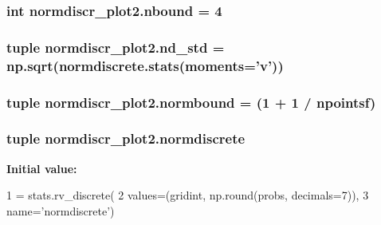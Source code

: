 \subsubsection[{nbound}]{\setlength{\rightskip}{0pt plus 5cm}int normdiscr\+\_\+plot2.\+nbound = 4}\label{namespacenormdiscr__plot2_a75e9153d69cb7c81a7ce8a505f2aa7ae}
\hypertarget{namespacenormdiscr__plot2_aa6b0f5d41e331e7549b122192c1db0a0}{}
\subsubsection[{nd\+\_\+std}]{\setlength{\rightskip}{0pt plus 5cm}tuple normdiscr\+\_\+plot2.\+nd\+\_\+std = {\bf np.\+sqrt}(normdiscrete.\+stats(moments='v'))}\label{namespacenormdiscr__plot2_aa6b0f5d41e331e7549b122192c1db0a0}
\hypertarget{namespacenormdiscr__plot2_a1d8a343b3fc043bbc9cd58f5e5649453}{}
\subsubsection[{normbound}]{\setlength{\rightskip}{0pt plus 5cm}tuple normdiscr\+\_\+plot2.\+normbound = (1 + 1 / {\bf npointsf})}\label{namespacenormdiscr__plot2_a1d8a343b3fc043bbc9cd58f5e5649453}
\hypertarget{namespacenormdiscr__plot2_a2441ca073bb0331350476716954626c7}{}
\subsubsection[{normdiscrete}]{\setlength{\rightskip}{0pt plus 5cm}tuple normdiscr\+\_\+plot2.\+normdiscrete}\label{namespacenormdiscr__plot2_a2441ca073bb0331350476716954626c7}
{\bfseries Initial value\+:}
\begin{DoxyCode}
1 = stats.rv\_discrete(
2                         values=(gridint, np.round(probs, decimals=7)),
3                         name=\textcolor{stringliteral}{'normdiscrete'})
\end{DoxyCode}
\hypertarget{namespacenormdiscr__plot2_a55c7317cc02371eb982a60573ed2a46f}{}
